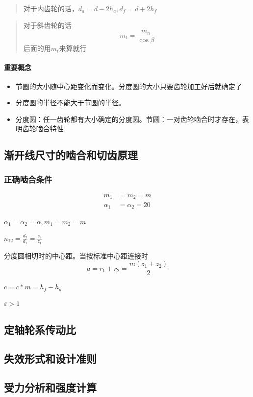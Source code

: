 \documentclass[twocolumn]{ctexart}
\begin{document}
\begin{quote}
{\qquad{}\ccwd\kaishu{}
对于内齿轮的话，$d_a=d-2h_a,d_f=d+2h_f$
}
\end{quote}

\begin{quote}
  {\qquad{}\ccwd\kaishu{}
  对于斜齿轮的话
  $$
  m_t=\frac{m_n}{\cos \beta}
  $$
  后面的用$m_t$来算就行
  }
  
\end{quote}
\paragraph{重要概念}
\begin{itemize}
\item 节圆的大小随中心距变化而变化。分度圆的大小只要齿轮加工好后就确定了
\item 分度圆的半径不能大于节圆的半径。
\item 分度圆：任一齿轮都有大小确定的分度圆。节圆：一对齿轮啮合时才存在，表明齿轮啮合特性
\end{itemize}

\subsection{渐开线尺寸的啮合和切齿原理}
\subsubsection{正确啮合条件}
\begin{align*}
  m_1&=m_2=m\\
\alpha_1&=\alpha_2=20
\end{align*}
\begin{description}[leftmargin=1.3cm,style=nextline,nosep]%
  \item[正确啮合条件] $\alpha_{1}=\alpha_2=\alpha,m_1=m_2=m$ 
  \item[传动比] $n_{12}=\frac{d_2}{d_1}=\frac{z_2}{z_1}$ 
  \item[标准中心距] 分度圆相切时的中心距。当按标准中心距连接时
   $$
   a=r_1+r_2=\frac{m(z_1+z_2)}{2}
   $$
   \item[顶隙] $c=c*m=h_f-h_a$ 
   \item[连续传动] $\varepsilon >1$ 
\end{description}

\subsection{定轴轮系传动比}
\subsection{失效形式和设计准则} 
\subsection{受力分析和强度计算}
\end{document}
